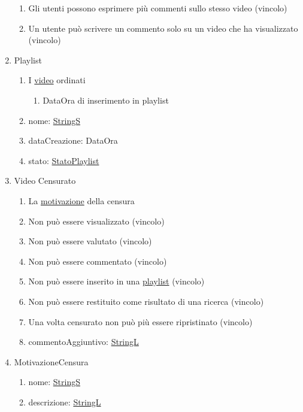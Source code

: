 \documentclass{article}
\begin{document}
\begin{enumerate}
\begin{enumerate}
        \item Gli utenti possono esprimere più commenti sullo stesso video (vincolo)
        \item Un utente può scrivere un commento solo su un video che ha visualizzato (vincolo)
    \end{enumerate}
    \item\label{sec:RequisitiPlaylist} Playlist
    \begin{enumerate}
        \item I \hyperref[sec:RequisitiVideo]{video} ordinati
        \begin{enumerate}
            \item DataOra di inserimento in playlist
        \end{enumerate}
        \item nome: \hyperref[sec:TipoStringS]{StringS}
        \item dataCreazione: DataOra
        \item stato: \hyperref[sec:TipoStatoPlaylist]{StatoPlaylist}
    \end{enumerate}
    \item\label{sec:RequisitiVideoCensurato} Video Censurato
    \begin{enumerate}
        \item La \hyperref[sec:RequisitiMotivazioneCensura]{motivazione} della censura
        \item Non può essere visualizzato (vincolo)
        \item Non può essere valutato (vincolo)
        \item Non può essere commentato (vincolo)
        \item Non può essere inserito in una \hyperref[sec:RequisitiPlaylist]{playlist} (vincolo)
        \item Non può essere restituito come risultato di una ricerca (vincolo)
        \item Una volta censurato non può più essere ripristinato (vincolo)
        \item commentoAggiuntivo: \hyperref[sec:TipoStringL]{StringL}
    \end{enumerate}
    \item\label{sec:RequisitiMotivazioneCensura} MotivazioneCensura
    \begin{enumerate}
        \item nome: \hyperref[sec:TipoStringS]{StringS}
        \item descrizione: \hyperref[sec:TipoStringL]{StringL}
    \end{enumerate}
\end{enumerate}
\end{document}
